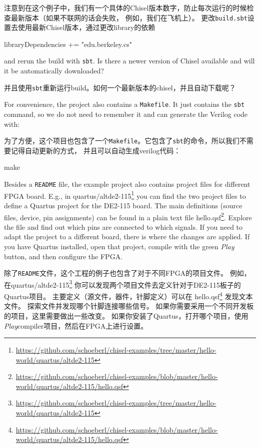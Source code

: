\documentclass[%
    10pt,
    headinclude, footexclude,
    openright, %
    notitlepage,
    cleardoubleempty,
    headsepline,
    pointlessnumbers,
    bibtotoc, idxtotoc,
    ]{scrbook}
\newcommand{\code}[1]{{\small{\texttt{#1}}}}
\newcommand{\myref}[2]{\href{#1}{#2}}
\renewcommand{\myref}[2]{{#2}{\footnote{\url{#1}}}}
\begin{document}
\noindent 注意到在这个例子中，我们有一个具体的Chisel版本数字，防止每次运行的时候检查最新版本（如果不联网的话会失败，
例如，我们在飞机上）。
更改\code{build.sbt}设置去使用最新Chisel版本，通过更改library的依赖

\begin{chisel}
libraryDependencies += "edu.berkeley.cs" %
\end{chisel}

\noindent and rerun the build with \code{sbt}. Is there a newer version of Chisel
available and will it be automatically downloaded?

\noindent 并且使用\code{sbt}重新运行build。如何一个最新版本的chisel，并且自动下载呢？

For convenience, the project also contains a \code{Makefile}.
It just contains the \code{sbt} command, so we do not need to remember it and
can generate the Verilog code with:

为了方便，这个项目也包含了一个\code{Makefile}。它包含了\code{sbt}的命令，所以我们不需要记得自动更新的方式，
并且可以自动生成verilog代码：

\begin{chisel}
make
\end{chisel}

Besides a \code{README} file, the example project also contains project
files for different FPGA board. E.g., in
\myref{https://github.com/schoeberl/chisel-examples/tree/master/hello-world/quartus/altde2-115}{quartus/altde2-115} 
you can find the two project files to define a Quartus project for the DE2-115 board.
The main definitions (source files, device, pin assignments) can be found in a plain text file
\myref{https://github.com/schoeberl/chisel-examples/blob/master/hello-world/quartus/altde2-115/hello.qsf}{hello.qsf}.
Explore the file and find out which pins are connected to which signals.
If you need to adapt the project to a different board, there is where the changes are applied.
If you have Quartus installed, open that project, compile with the green \emph{Play} button,
and then configure the FPGA.

除了\code{README}文件，这个工程的例子也包含了对于不同FPGA的项目文件。
例如，在\myref{https://github.com/schoeberl/chisel-examples/tree/master/hello-world/quartus/altde2-115}{quartus/altde2-115}
你可以发现两个项目文件去定义针对于DE2-115板子的Quartus项目。
主要定义（源文件，器件，针脚定义）可以在
\myref{https://github.com/schoeberl/chisel-examples/blob/master/hello-world/quartus/altde2-115/hello.qsf}{hello.qsf}
发现文本文件。
探索文件并发现哪个针脚连接哪些信号。
如果你需要采用一个不同开发板的项目，这里需要做出一些改变。
如果你安装了Quartus，打开哪个项目，使用\emph{Play}compiler项目，然后在FPGA上进行设置。
\end{document}
